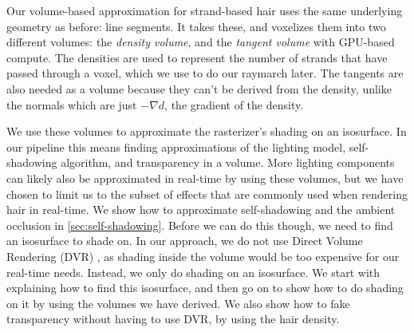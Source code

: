\documentclass{egpubl}
\begin{document}


Our volume-based approximation for strand-based hair uses the same underlying geometry as before: line segments. It takes these, and voxelizes them into two different volumes: the \emph{density volume}, and the \emph{tangent volume} with GPU-based compute. The densities are used to represent the number of strands that have passed through a voxel, which we use to do our raymarch later. The tangents are also needed as a volume because they can't be derived from the density, unlike the normals which are just $-\nabla d$, the gradient of the density.

We use these volumes to approximate the rasterizer's shading on an isosurface. In our pipeline this means finding approximations of the lighting model, self-shadowing algorithm, and transparency in a volume. More lighting components can likely also be approximated in real-time by using these volumes, but we have chosen to limit us to the subset of effects that are commonly used when rendering hair in real-time. We show how to approximate self-shadowing and the ambient occlusion in \cref{sec:self-shadowing}. Before we can do this though, we need to find an isosurface to shade on. In our approach, we do not use Direct Volume Rendering (DVR) \cite{hadwiger2006gpu}, as shading inside the volume would be too expensive for our real-time needs. Instead, we only do shading on an isosurface. We start with explaining how to find this isosurface, and then go on to show how to do shading on it by using the volumes we have derived. We also show how to fake transparency without having to use DVR, by using the hair density.
\end{document}
